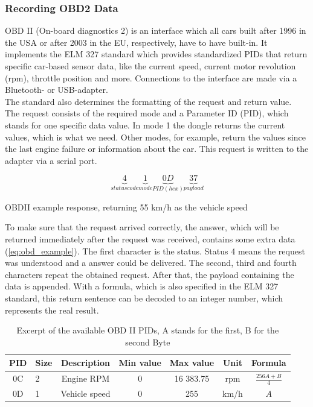 \subsubsection{Recording OBD2 Data}
OBD II (On-board diagnostics 2) is an interface which all cars built after 1996 in the USA or after 2003 in the EU, respectively, have to have built-in. It implements the ELM 327 standard which provides standardized PIDs that return specific car-based sensor data, like the current speed, current motor revolution (rpm), throttle position and more. Connections to the interface are made via a Bluetooth- or USB-adapter.\\
The standard also determines the formatting of the request and return value.\\
The request consists of the required mode and a Parameter ID (PID), which stands for one specific data value. In mode 1 the dongle returns the current values, which is what we need. Other modes, for example, return the values since the last engine failure or information about the car. This request is written to the adapter via a serial port.

\begin{equation}
	\label{eq:obd_example}
		\underbrace{4}_{status code}
		\underbrace{1}_{mode}
		\underbrace{0D}_{PID (hex)}
		\underbrace{37}_{payload}
\end{equation}
\begin{center}
	OBDII example response, returning 55 km/h as the vehicle speed
\end{center}

To make sure that the request arrived correctly, the answer, which will be returned immediately after the request was received, contains some extra data (\ref{eq:obd_example}). The first character is the status. Status 4 means the request was understood and a answer could be delivered. The second, third and fourth characters repeat the obtained request. After that, the payload containing the data is appended. With a formula, which is also specified in the ELM 327 standard, this return sentence can be decoded to an integer number, which represents the real result.

\begin{table}[!ht]
	\begin{center}
		\begin{tabularx}{\textwidth}{|c | X | c | c | c | c | c |}
			\hline
			PID & Size & Description & Min value & Max value & Unit & Formula\\ \hline
			0C & 2 & Engine RPM & 0 & 16 383.75 & rpm & $\frac{256A + B}{4}$\\ \hline
			0D & 1 & Vehicle speed & 0 & 255 & km/h & $A$\\ \hline
		\end{tabularx}
	\end{center}
	\caption{Excerpt of the available OBD II PIDs, A stands for the first, B for the second Byte}
\end{table}

